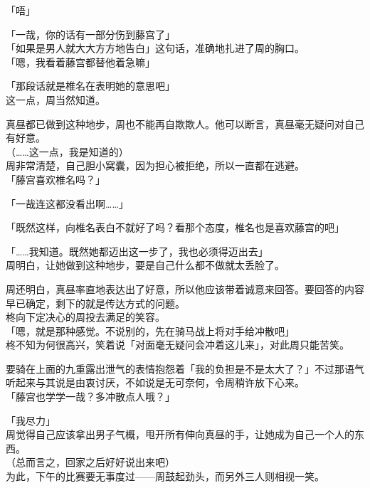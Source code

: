 「唔」

「一哉，你的话有一部分伤到藤宫了」\\

「如果是男人就大大方方地告白」这句话，准确地扎进了周的胸口。\\

「嗯，我看着藤宫都替他着急嘛」

「那段话就是椎名在表明她的意思吧」\\

这一点，周当然知道。

真昼都已做到这种地步，周也不能再自欺欺人。他可以断言，真昼毫无疑问对自己有好意。\\

（……这一点，我是知道的）\\

周非常清楚，自己胆小窝囊，因为担心被拒绝，所以一直都在逃避。\\

「藤宫喜欢椎名吗？」

「一哉连这都没看出啊……」

「既然这样，向椎名表白不就好了吗？看那个态度，椎名也是喜欢藤宫的吧」

「……我知道。既然她都迈出这一步了，我也必须得迈出去」\\

周明白，让她做到这种地步，要是自己什么都不做就太丢脸了。

周还明白，真昼率直地表达出了好意，所以他应该带着诚意来回答。要回答的内容早已确定，剩下的就是传达方式的问题。\\

柊向下定决心的周投去满足的笑容。\\

「嗯，就是那种感觉。不说别的，先在骑马战上将对手给冲散吧」\\

柊不知为何很高兴，笑着说「对面毫无疑问会冲着这儿来」，对此周只能苦笑。

要骑在上面的九重露出泄气的表情抱怨着「我的负担是不是太大了？」不过那语气听起来与其说是由衷讨厌，不如说是无可奈何，令周稍许放下心来。\\

「藤宫也学学一哉？多冲散点人哦？」

「我尽力」\\

周觉得自己应该拿出男子气概，甩开所有伸向真昼的手，让她成为自己一个人的东西。\\

（总而言之，回家之后好好说出来吧）\\

为此，下午的比赛要无事度过——周鼓起劲头，而另外三人则相视一笑。
